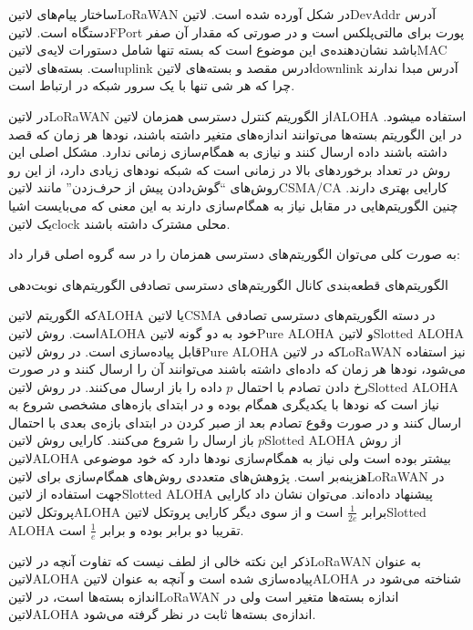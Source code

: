 ساختار پیام‌های ‌لاتین{LoRaWAN} در شکل  آورده شده است. ‌لاتین{DevAddr} آدرس دستگاه است.
‌لاتین{FPort} پورت برای مالتی‌پلکس است و در صورتی که مقدار آن صفر باشد نشان‌دهنده‌ی این موضوع است که بسته تنها شامل
دستورات لایه‌ی ‌لاتین{MAC} است. بسته‌های ‌لاتین{uplink} ادرس مقصد و بسته‌های ‌لاتین{downlink} آدرس مبدا ندارند
چرا که هر شی تنها با یک سرور شبکه در ارتباط است.

در ‌لاتین{LoRaWAN} از الگوریتم کنترل دسترسی همزمان ‌لاتین{ALOHA} استفاده میشود. در این الگوریتم بسته‌ها می‌توانند اندازه‌های متغیر داشته باشند، نودها هر زمان که قصد داشته باشند داده ارسال کنند و نیازی به همگام‌سازی زمانی ندارد.
مشکل اصلی این روش در تعداد برخوردهای بالا در زمانی است که شبکه نودهای زیادی دارد، از این رو روش‌های ``گوش‌دادن پیش از حرف‌زدن'' مانند ‌لاتین{CSMA/CA} کارایی بهتری دارند.
چنین الگوریتم‌هایی در مقابل نیاز به همگام‌سازی دارند به این معنی که می‌بایست اشیا یک ‌لاتین{clock} محلی مشترک داشته باشند.

به صورت کلی می‌توان الگوریتم‌های دسترسی همزمان را در سه گروه اصلی قرار داد:

 الگوریتم‌های قطعه‌بندی کانال
 الگوریتم‌های دسترسی تصادفی
 الگوریتم‌های نوبت‌دهی

که الگوریتم ‌لاتین{ALOHA} یا ‌لاتین{CSMA} در دسته الگوریتم‌های دسترسی تصادفی است. روش ‌لاتین{ALOHA} خود به دو گونه ‌لاتین{Pure ALOHA} و ‌لاتین{Slotted ALOHA}
قابل پیاده‌سازی است. در روش ‌لاتین{Pure ALOHA} که در ‌لاتین{LoRaWAN} نیز استفاده می‌شود، نودها هر زمان که داده‌ای داشته باشند می‌توانند آن را ارسال کنند و در صورت رخ دادن تصادم
با احتمال $p$ داده را باز ارسال می‌کنند. در روش ‌لاتین{Slotted ALOHA} نیاز است که نودها با یکدیگری همگام بوده و در ابتدای بازه‌های مشخصی شروع به ارسال کنند و در صورت
وقوع تصادم بعد از صبر کردن در ابتدای بازه‌ی بعدی با احتمال $p$ باز ارسال را شروع می‌کنند. کارایی روش ‌لاتین{Slotted ALOHA} از روش ‌لاتین{ALOHA} بیشتر بوده است ولی نیاز به همگام‌سازی نودها دارد
که خود موضوعی هزینه‌بر است. پژوهش‌های متعددی روش‌های همگام‌سازی برای ‌لاتین{LoRaWAN} در جهت استفاده از ‌لاتین{Slotted ALOHA} پیشنهاد داده‌اند.
می‌توان نشان داد کارایی پروتکل ‌لاتین{ALOHA} برابر $\frac{1}{2e}$ است و از سوی دیگر کارایی پروتکل ‌لاتین{Slotted ALOHA} تقریبا دو برابر بوده و برابر $\frac{1}{e}$ است.

ذکر این نکته خالی از لطف نیست که تفاوت آنچه در ‌لاتین{LoRaWAN} به عنوان ‌لاتین{ALOHA} پیاده‌سازی شده است و آنچه به عنوان ‌لاتین{ALOHA} شناخته می‌شود در اندازه بسته‌ها است،
در ‌لاتین{LoRaWAN} اندازه بسته‌ها متغیر است ولی در ‌لاتین{ALOHA} اندازه‌ی بسته‌ها ثابت در نظر گرفته می‌شود.

